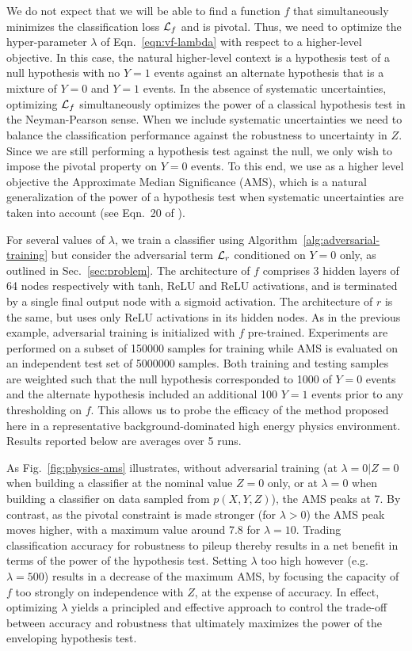 \documentclass{article}
\theoremstyle{plain}
\begin{document}
We do not expect that we will be able to find a function $f$ that simultaneously
minimizes the classification loss ${\cal L}_f$ and is pivotal. Thus, we need to optimize
the hyper-parameter $\lambda$ of Eqn.~\ref{eqn:vf-lambda} with respect to
a higher-level objective. In this case, the natural higher-level context is a
hypothesis test of a null hypothesis with no $Y=1$ events against an
alternate hypothesis that is a mixture of $Y=0$ and $Y=1$ events.
In the absence of systematic uncertainties, optimizing ${\cal L}_f$ simultaneously
optimizes the power of a classical hypothesis test in the Neyman-Pearson sense.
When we include systematic uncertainties we need to balance the
classification performance against the robustness to uncertainty in $Z$.
Since we are still performing a hypothesis test against the null, we only
wish to impose the pivotal property on $Y=0$ events. To this end,
we use as a higher level objective the Approximate Median Significance (AMS), which is a natural generalization
of the power of a hypothesis test when systematic uncertainties are taken into account
(see Eqn.~20 of \cite{adam2014higgs}).

For several values of $\lambda$, we train a classifier
using  Algorithm~\ref{alg:adversarial-training} but consider the adversarial
term ${\cal L}_r$ conditioned on $Y=0$ only, as outlined in
Sec.~\ref{sec:problem}. The architecture of $f$ comprises 3 hidden layers of 64 nodes
respectively with tanh, ReLU and ReLU activations, and is terminated by a single final
output node with a sigmoid activation. The architecture of $r$ is the same,
but uses only ReLU activations in its hidden nodes.
As in the previous example, adversarial training is initialized
with $f$ pre-trained. Experiments are performed on a subset of
150000 samples for training while AMS is evaluated on an independent test set of
5000000 samples. Both training and testing samples are weighted such that the
null hypothesis corresponded to 1000  of $Y=0$ events and the alternate
hypothesis included an additional 100 $Y=1$ events prior to any thresholding on $f$.
This allows us to probe the efficacy of the
method proposed here in a representative background-dominated high energy physics environment.
Results reported below are averages over 5 runs.



As  Fig.~\ref{fig:physics-ams} illustrates, without adversarial training (at
$\lambda=0|Z=0$ when building a classifier at the nominal value $Z=0$ only, or
at $\lambda=0$ when building a classifier on data sampled from $p(X,Y,Z)$), the
AMS peaks at $7$. By contrast, as the pivotal constraint
is made stronger (for $\lambda > 0$) the AMS peak moves higher, with a maximum
value around  $7.8$ for $\lambda=10$. Trading classification
accuracy for robustness to pileup thereby results in a net
benefit in terms of the power of the hypothesis test. Setting $\lambda$ too high however
(e.g. $\lambda=500$) results in a decrease of the maximum AMS, by
focusing the capacity of $f$ too strongly on independence with $Z$, at the expense of
accuracy. In effect, optimizing $\lambda$
yields a principled and effective approach to control the trade-off between
accuracy and robustness that ultimately maximizes the
power of the enveloping hypothesis test.
\end{document}
